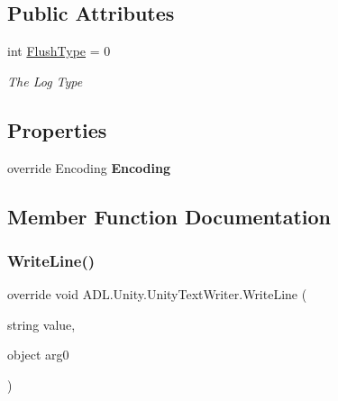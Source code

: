 \subsection*{Public Attributes}
\begin{DoxyCompactItemize}
\item 
int \mbox{\hyperlink{class_a_d_l_1_1_unity_1_1_unity_text_writer_a5d9cf1373da2cf300bf88f11f8ec078a}{Flush\+Type}} = 0
\begin{DoxyCompactList}\small\item\em The Log Type \end{DoxyCompactList}\end{DoxyCompactItemize}
\subsection*{Properties}
\begin{DoxyCompactItemize}
\item 
\mbox{\label{class_a_d_l_1_1_unity_1_1_unity_text_writer_ae188dacb6a045f6f314480f0fbd18ccc}} 
override Encoding {\bfseries Encoding}
\end{DoxyCompactItemize}


\subsection{Member Function Documentation}
\mbox{\label{class_a_d_l_1_1_unity_1_1_unity_text_writer_a12b1bcfd083d9e771330d95d1857e569}} 
\subsubsection{\texorpdfstring{Write\+Line()}{WriteLine()}}
{\footnotesize\ttfamily override void A\+D\+L.\+Unity.\+Unity\+Text\+Writer.\+Write\+Line (\begin{DoxyParamCaption}\item[{string}]{value,  }\item[{object}]{arg0 }\end{DoxyParamCaption})}



